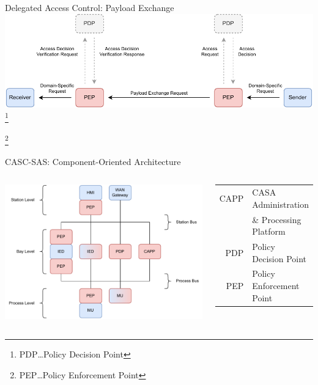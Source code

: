 \documentclass[en]{sdqbeamer}
\newcommand\nonumberfootnote[1]{%
  \begingroup
  \renewcommand\thefootnote{}\footnote{#1}%
  \addtocounter{footnote}{-1}%
  \endgroup
}
\begin{document}
\begin{frame}{Delegated Access Control: Payload Exchange}
    \centering
    \includegraphics[width=1.0\textwidth]{./figures/SABAAC_protocols_accesscontrol_payloadexchange_with_pdp.drawio.pdf}
    \nonumberfootnote{\color{Grey} PDP\dots Policy Decision Point}
    \nonumberfootnote{\color{IndianRed} PEP\dots Policy Enforcement Point}
\end{frame}
\begin{frame}{CASC-SAS: Component-Oriented Architecture}
    \begin{columns}
        \centering
        \includegraphics[height=0.75\textheight]{./figures/casc_architecture_color_shortened.drawio.pdf}
        \footnotesize
        \begin{center}
            \begin{tabular}{r l}
                \color{IndianRed} CAPP & \color{IndianRed} CASA Administration \\
                     & \color{IndianRed} \& Processing Platform \\
                \color{IndianRed} PDP & \color{IndianRed} Policy Decision Point \\
                \color{IndianRed} PEP & \color{IndianRed} Policy Enforcement Point \vspace{1em}\\

\end{tabular}
\end{center}
\end{columns}
\end{frame}
\end{document}
